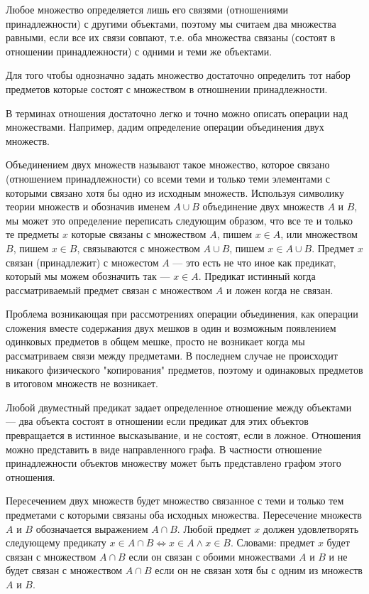 \documentclass[letterpaper, 10pt]{article}
\theoremstyle{definition}
\begin{document}
Любое множество определяется лишь его связями (отношениями принадлежности) с
другими объектами, поэтому мы считаем два множества равными, если все их связи
совпают, т.е. оба множества связаны (состоят в отношении принадлежности) с
одними и теми же объектами.

Для того чтобы однозначно задать множество достаточно определить тот набор
предметов которые состоят с множеством в отношнении принадлежности.

В терминах отношения достаточно легко и точно можно описать операции над
множествами. Например, дадим определение операции объединения двух множеств.

Объединением двух множеств называют такое множество, которое связано (отношением
принадлежности) со всеми теми и только теми элементами с которыми связано хотя бы
одно из исходным множеств. Используя символику теории множеств и обозначив
именем $A
\cup B$ объединение двух множеств $A$ и $B$, мы может это определение переписать
следующим образом, что все те и только те предметы $x$ которые связаны с
множеством $A$, пишем $x \in A$, или множеством $B$, пишем $x \in B$, связываются
с множеством $A \cup B$, пишем $x \in A \cup B$. Предмет $x$ связан
(принадлежит) с множестом $A$ --- это есть не что иное как предикат, который мы
можем обозначить так --- $x \in A$. Предикат истинный когда рассматриваемый
предмет связан с множеством $A$ и ложен когда не связан.

Проблема возникающая при рассмотрениях операции объединения, как операции
сложения вместе содержания двух мешков в один и возможным появлением одинковых
предметов в общем мешке, просто не возникает когда мы рассматриваем связи между
предметами. В последнем случае не происходит никакого физического "копирования"
предметов, поэтому и одинаковых предметов в итоговом множеств не возникает.

Любой двуместный предикат задает определенное отношение между объектами --- два
объекта состоят в отношении если предикат для этих объектов превращается в
истинное высказывание, и не состоят, если в ложное. Отношения можно представить
в виде направленного графа. В частности отношение принадлежности объектов
множеству может быть представлено графом этого отношения.

Пересечением двух множеств будет множество связанное с теми и только тем
предметами с которыми связаны оба исходных множества. Пересечение множеств $A$ и
$B$ обозначается выражением $A \cap B$. Любой предмет $x$ должен удовлетворять
следующему предикату $x \in A \cap B \iff x \in A \land x \in B$. Словами:
предмет $x$ будет связан с множеством $A \cap B$ если он связан с обоими
множествами $A$ и $B$ и не будет связан с множеством $A \cap B$ если он не
связан хотя бы с одним из множеств $A$ и $B$. 
\end{document}
